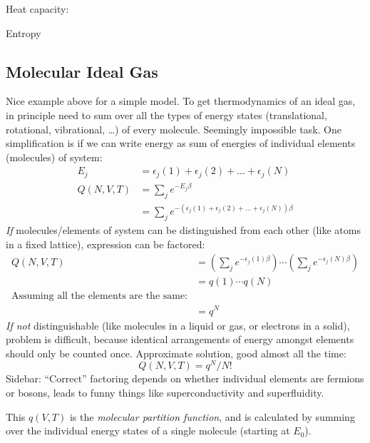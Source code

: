 \documentclass[11pt]{article}
\begin{document}
\noindent Heat capacity:

\noindent Entropy

\subsection{Molecular Ideal Gas}
\label{sec:org5a695ba}
Nice example above for a simple model.  To get thermodynamics of an ideal gas,
in principle need to sum over all the types of energy states (translational,
rotational, vibrational, \ldots{}) of every molecule.  Seemingly impossible task.
One simplification is if we can write energy as sum of energies of individual
elements (molecules) of system:
\begin{align}
  E_j&=\epsilon_j(1)+\epsilon_j(2) + ... + \epsilon_j(N) \\
  Q(N,V,T) &= \sum_j e^{-E_j\beta} \\
  &=\sum_je^{-(\epsilon_j(1)+\epsilon_j(2) + ... + \epsilon_j(N))\beta}
\end{align}
\emph{If} molecules/elements of system can be distinguished from each
        other (like atoms in a fixed lattice), expression can be factored:
  \begin{align}
    Q(N,V,T)&=\left ( \sum_j e^{-\epsilon_j(1)\beta}\right )\cdots \left ( \sum_j
      e^{-\epsilon_j(N)\beta}\right ) \\
  &= q(1)\cdots q(N) \\
  \text{Assuming all the elements are the same:}\\
  &= q^N
\end{align}
\emph{If not} distinguishable (like molecules in a liquid or gas, or
      electrons in a solid), problem is difficult, because identical
      arrangements of energy amongst elements should only be counted once.
      Approximate solution, good almost all the time:
\begin{equation}
  Q(N,V,T)=q^N/N!
\end{equation}
Sidebar: ``Correct'' factoring depends on whether individual elements
     are fermions or bosons, leads to funny things like superconductivity and
     superfluidity.

This \(q(V,T)\) is the \emph{molecular partition function}, and is calculated by
summing over the individual energy states of a single molecule (starting at \(E_0\)).
\end{document}
